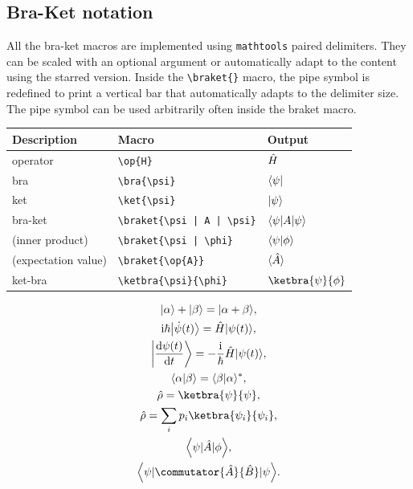 \documentclass[DIV=13]{scrartcl}
\begin{document}
\subsection{Bra-Ket notation}
All the bra-ket macros are implemented using \texttt{mathtools} paired
delimiters. They can be scaled with an optional argument or automatically
adapt to the content using the starred version. Inside the \verb|\braket{}|
macro, the pipe symbol is redefined to print a vertical bar that automatically
adapts to the delimiter size. The pipe symbol can be used arbitrarily often
inside the braket macro.
\begin{center}
  \begin{tabular}{lll}
    \toprule
    \textbf{Description} & \textbf{Macro}    & \textbf{Output} \\
    \midrule
    operator             & \verb|\op{H}|     & $\hat{H}$        \\
    \midrule
    bra                  & \verb|\bra{\psi}| & $\langle\psi\rvert$    \\
    ket                  & \verb|\ket{\psi}| & $\lvert\psi\rangle$    \\
    \midrule
    bra-ket              & \verb"\braket{\psi | A | \psi}"
                         & $\langle\psi | A | \psi\rangle$          \\[.5ex]
    (inner product)      & \verb"\braket{\psi | \phi}"
                         & $\langle\psi|\phi\rangle$                \\[.5ex]
    (expectation value)  & \verb"\braket{\op{A}}"
                         & $\langle\hat{A}\rangle$                   \\
    \midrule
    ket-bra              & \verb|\ketbra{\psi}{\phi}|
                         & $\ketbra{\psi}{\phi}$               \\
    \bottomrule
  \end{tabular}
\end{center}
\begin{gather}
  \ket{\alpha}+\ket{\beta} = \ket{\alpha+\beta},\\
  \i\hbar\ket*{\dot{\psi}(t)} = \op{H}\ket{\psi(t)}, \\
  \ket*{\dd{\psi(t)}{t}} = -\frac{\i}{\hbar}\op{H}\ket{\psi(t)}, \\
  \braket{\alpha | \beta} = \cc{\braket{\beta | \alpha}}, \\
  \op{\rho} = \ketbra{\psi}{\psi}, \\
  \op{\rho} = \sum_i p_i \ketbra{\psi_i}{\psi_i}, \\
  \braket*{\psi | \op{A} | \phi}, \\
  \braket*{\psi | \commutator{\op{A}}{\op{B}} | \psi}.
\end{gather}
\end{document}
